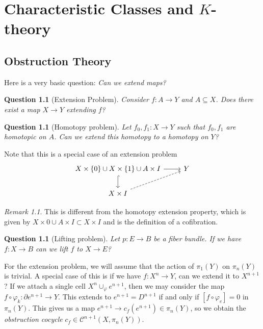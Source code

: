 \documentclass[leqno, openany]{memoir}
\newtheorem{quest}[thm]{Question}
\theoremstyle{definition}
\theoremstyle{remark}
\newtheorem{rmk}[thm]{Remark}
\theoremstyle{plain}
\theoremstyle{definition}
\theoremstyle{remark}
\newcommand{\mc}[1]{\mathcal{#1}}
\begin{document}
\chapter{Characteristic Classes and $K$-theory}%
\label{cha:characteristic_classes_and_k_theory}

\section{Obstruction Theory}%
\label{sec:obstruction_theory}

Here is a very basic question: \textit{Can we extend maps?}

\begin{quest}[Extension Problem]
    Consider $f \colon A \to Y$ and $A \subseteq X$. Does there exist a map $X \to Y$ extending $f$?
\end{quest}

\begin{quest}[Homotopy problem]
    Let $f_0, f_1 \colon X \to Y$ such that $f_0, f_1$ are homotopic on $A$. Can we extend this homotopy to a homotopy on $Y$?
\end{quest}

Note that this is a special case of an extension problem
\begin{equation*}
\begin{tikzcd}
    X \times \qty{0} \cup X \times \qty{1} \cup A \times I \ar{r} \ar[hookrightarrow]{d} & Y \\
    X \times I \ar[dashrightarrow]{ur}
\end{tikzcd}
\end{equation*}

\begin{rmk}
    This is different from the homotopy extension property, which is given by $X \times \qty{0} \cup A \times I \subset X \times I$ and is the definition of a cofibration.
\end{rmk}

\begin{quest}[Lifting problem]
    Let $p \colon E \to B$ be a fiber bundle. If we have $f \colon X \to B$ can we lift $f$ to $X \to E$?
\end{quest}

For the extension problem, we will assume that the action of $\pi_1(Y)$ on $\pi_n(Y)$ is trivial. A special case of this is if we have $f \colon X^n \to Y$, can we extend it to $X^{n+1}$? If we attach a single cell $X^n \cup_{\varphi} e^{n+1}$, then we may consider the map $f \circ \varphi_k \colon \partial e^{n+1} \to Y$. This extends to $e^{n+1} = D^{n+1}$ if and only if $[f \circ \varphi_e] = 0$ in $\pi_n(Y)$. This gives us a map $e^{n+1} \to c_f (e^{n+1}) \in \pi_n(Y)$, so we obtain the \textit{obstruction cocycle} $c_f \in \mc{C}^{n+1}(X, \pi_n(Y))$.
\end{document}
